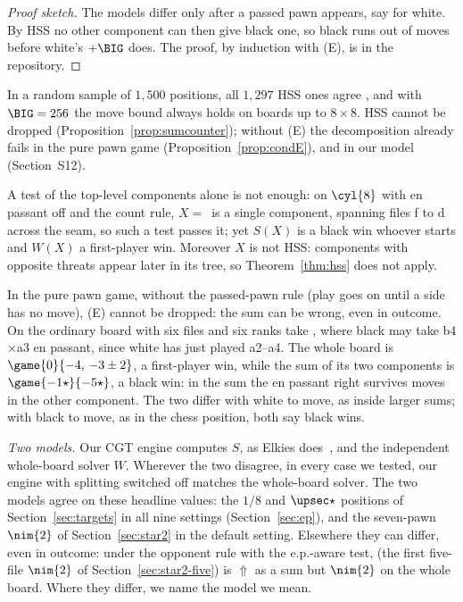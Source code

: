 \begin{proof}[Proof sketch]
The models differ only after a passed pawn appears, say for white. By HSS no other component can then give black
one, so black runs out of moves before white's $+\BIG$ does. The proof, by induction with (E),
is in the repository.
\end{proof}

In a random sample of $1{,}500$ positions, all $1{,}297$ HSS ones agree , and with $\BIG=256$ the move
bound always holds on boards up to $8\times8$. HSS cannot be dropped (Proposition~\ref{prop:sumcounter});
without (E) the decomposition already fails in the pure pawn game (Proposition~\ref{prop:condE}), and in our model  (Section~S12).

\begin{proposition}[\lab{C2}]\label{prop:sumcounter}
A test of the top-level components alone is not enough: on $\cyl{8}$ with en passant off and the count rule, $X=$\, is a single component, spanning files f to d across the seam, so such a test passes it; yet
$S(X)$ is a black win whoever starts and $W(X)$ a first-player win. Moreover $X$ is not HSS: components with
opposite threats appear later in its tree, so Theorem~\ref{thm:hss} does not apply.
\end{proposition}

\begin{proposition}[\lab{C1}]\label{prop:condE}
In the pure pawn game, without the passed-pawn rule (play goes on until a side has no move), (E) cannot
be dropped: the sum can be wrong, even in outcome. On the ordinary board with six files and six ranks take
, where black may take b4$\times$a3 en passant, since white has just played a2--a4. The
whole board is $\game{0}{-4,\,-3\pm2}$, a first-player win, while the sum of its two components is
$\game{-1\star}{-5\star}$, a black win: in the sum the en passant right survives moves in the other component. The two differ
with white to move, as inside larger sums; with black to move, as in the chess position,
both say black wins.
\end{proposition}

\emph{Two models.} Our CGT engine computes $S$, as Elkies does~\cite{Elkies1996}, and the independent
whole-board solver $W$. Wherever the two disagree, in every case we tested,
our engine with splitting switched off matches the whole-board solver. The two models agree on these headline values: the $1/8$ and $\upsec\star$
positions of Section~\ref{sec:targets} in all nine settings (Section~\ref{sec:ep}), and the seven-pawn $\nim{2}$
of Section~\ref{sec:star2} in the default setting. Elsewhere they can differ, even in outcome: under the
opponent rule with the e.p.-aware test,  (the first five-file $\nim{2}$ of
Section~\ref{sec:star2-five}) is ${\Uparrow}$ as a sum but $\nim{2}$ on the whole board. Where they differ, we name the model we mean.
